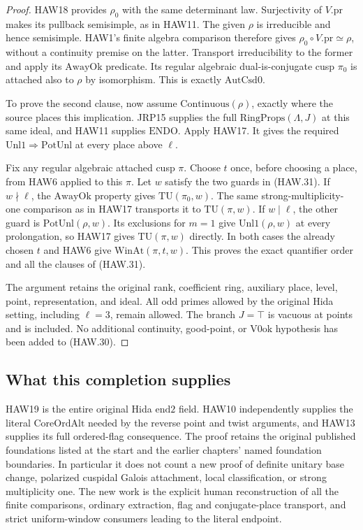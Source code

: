 \documentclass[11pt,a4paper]{article}
\numberwithin{equation}{section}
\theoremstyle{remark}\newtheorem{remark}[theorem]{Remark}
\begin{document}
\begin{proof}
HAW18 provides $\rho_0$ with the same determinant law.
Surjectivity of $V.\mathrm{pr}$ makes its pullback
semisimple, as in HAW11.  The given $\rho$ is irreducible
and hence semisimple.  HAW1's finite algebra comparison
therefore gives
$\rho_0\circ V.\mathrm{pr}\simeq\rho$, without a
continuity premise on the latter.  Transport irreducibility
to the former and apply its $\mathrm{AwayOk}$ predicate.
Its regular algebraic dual-is-conjugate cusp $\pi_0$ is
attached also to $\rho$ by isomorphism.  This is exactly
$\mathrm{AutCsd0}$.

To prove the second clause, now assume
$\mathrm{Continuous}(\rho)$, exactly where the source
places this implication.  JRP15 supplies the full
$\mathrm{RingProps}(\Lambda,J)$ at this same ideal, and
HAW11 supplies $\mathrm{ENDO}$.  Apply HAW17.  It gives
the required $\mathrm{Unl1}\Rightarrow\mathrm{PotUnl}$
at every place above $\ell$.

Fix any regular algebraic attached cusp $\pi$.  Choose
$t$ once, before choosing a place, from HAW6 applied to
this $\pi$.  Let $w$ satisfy the two guards in (HAW.31).
If $w\nmid\ell$, the $\mathrm{AwayOk}$ property gives
$\mathrm{TU}(\pi_0,w)$.  The same strong-multiplicity-one
comparison as in HAW17 transports it to
$\mathrm{TU}(\pi,w)$.  If $w\mid\ell$, the other guard
is $\mathrm{PotUnl}(\rho,w)$.  Its exclusions for $m=1$
give $\mathrm{Unl1}(\rho,w)$ at every prolongation, so
HAW17 gives $\mathrm{TU}(\pi,w)$ directly.  In both cases
the already chosen $t$ and HAW6 give
$\mathrm{WinAt}(\pi,t,w)$.  This proves the exact quantifier
order and all the clauses of (HAW.31).

The argument retains the original rank, coefficient ring,
auxiliary place, level, point, representation, and ideal.
All odd primes allowed by the original Hida setting,
including $\ell=3$, remain allowed.  The branch $J=\top$
is vacuous at points and is included.  No additional
continuity, good-point, or $\mathrm{V0ok}$ hypothesis has
been added to (HAW.30).
\end{proof}

\subsection{What this completion supplies}

HAW19 is the entire original Hida $\mathrm{end2}$ field.
HAW10 independently supplies the literal $\mathrm{CoreOrdAlt}$
needed by the reverse point and twist arguments, and HAW13
supplies its full ordered-flag consequence.  The proof retains
the original published foundations listed at the start and
the earlier chapters' named foundation boundaries.  In
particular it does not count a new proof of definite unitary
base change, polarized cuspidal Galois attachment, local
classification, or strong multiplicity one.  The new work
is the explicit human reconstruction of all the finite
comparisons, ordinary extraction, flag and conjugate-place
transport, and strict uniform-window consumers leading to
the literal endpoint.
\end{document}
